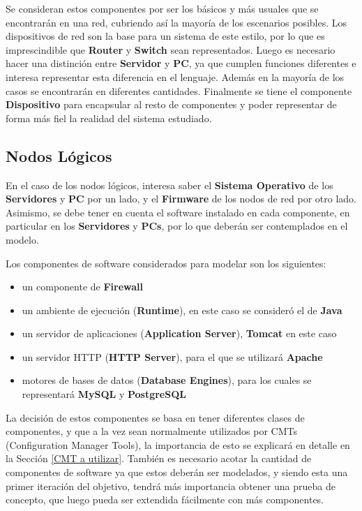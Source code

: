 Se consideran estos componentes por ser los básicos y más usuales que se encontrarán en una red, cubriendo así la mayoría de los escenarios posibles. Los dispositivos de red son la base para un sistema de este estilo, por lo que es imprescindible que \textbf{Router} y \textbf{Switch} sean representados. Luego es necesario hacer una distinción entre \textbf{Servidor} y \textbf{PC}, ya que cumplen funciones diferentes e interesa representar esta diferencia en el lenguaje. Además en la mayoría de los casos se encontrarán en diferentes cantidades.
Finalmente se tiene el componente \textbf{Dispositivo} para encapsular al resto de componentes y poder representar de forma más fiel la realidad del sistema estudiado.

\subsection{Nodos Lógicos}
En el caso de los nodos lógicos, interesa saber el \textbf{Sistema Operativo} de los \textbf{Servidores} y \textbf{PC} por un lado, y el \textbf{Firmware} de los nodos de red por otro lado. Asimismo, se debe tener en cuenta el software instalado en cada componente, en particular en los \textbf{Servidores} y \textbf{PCs}, por lo que deberán ser contemplados en el modelo. 

Los componentes de software considerados para modelar son los siguientes: 
\begin{itemize}
    \item un componente de \textbf{Firewall}
    \item un ambiente de ejecución (\textbf{Runtime}), en este caso se consideró el de \textbf{Java}
    \item un servidor de aplicaciones (\textbf{Application Server}), \textbf{Tomcat} en este caso
    \item un servidor HTTP (\textbf{HTTP Server}), para el que se utilizará \textbf{Apache}
    \item motores de bases de datos (\textbf{Database Engines}), para los cuales se representará \textbf{MySQL} y \textbf{PostgreSQL}
\end{itemize}

La decisión de estos componentes se basa en tener diferentes clases de componentes, y que a la vez sean normalmente utilizados por CMTs (Configuration Manager Tools), la importancia de esto se explicará en detalle en la Sección \ref{CMT a utilizar}. También es necesario acotar la cantidad de componentes de software ya que estos deberán ser modelados, y siendo esta una primer iteración del objetivo, tendrá más importancia obtener una prueba de concepto, que luego pueda ser extendida fácilmente con más componentes.

